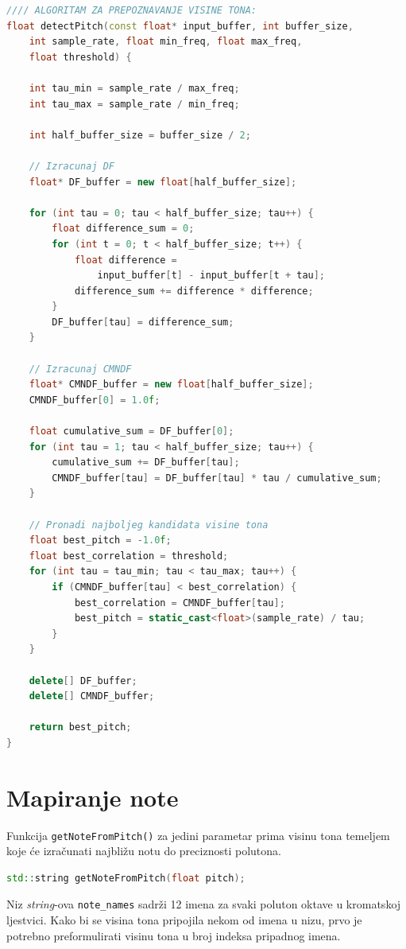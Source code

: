 \documentclass[times, utf8, diplomski, numeric]{fer}
\begin{document}
\begin{lstlisting}[language=C++, frame=single]
//// ALGORITAM ZA PREPOZNAVANJE VISINE TONA:
float detectPitch(const float* input_buffer, int buffer_size,
	int sample_rate, float min_freq, float max_freq,
	float threshold) {
	
	int tau_min = sample_rate / max_freq;
	int tau_max = sample_rate / min_freq;
	
	int half_buffer_size = buffer_size / 2;
	
	// Izracunaj DF
	float* DF_buffer = new float[half_buffer_size];
	
	for (int tau = 0; tau < half_buffer_size; tau++) {
		float difference_sum = 0;
		for (int t = 0; t < half_buffer_size; t++) {
			float difference = 
				input_buffer[t] - input_buffer[t + tau];
			difference_sum += difference * difference;
		}
		DF_buffer[tau] = difference_sum;
	}
	
	// Izracunaj CMNDF
	float* CMNDF_buffer = new float[half_buffer_size];
	CMNDF_buffer[0] = 1.0f;
	
	float cumulative_sum = DF_buffer[0];
	for (int tau = 1; tau < half_buffer_size; tau++) {
		cumulative_sum += DF_buffer[tau];
		CMNDF_buffer[tau] = DF_buffer[tau] * tau / cumulative_sum;
	}
	
	// Pronadi najboljeg kandidata visine tona
	float best_pitch = -1.0f;
	float best_correlation = threshold;
	for (int tau = tau_min; tau < tau_max; tau++) {
		if (CMNDF_buffer[tau] < best_correlation) {
			best_correlation = CMNDF_buffer[tau];
			best_pitch = static_cast<float>(sample_rate) / tau;
		}
	}
	
	delete[] DF_buffer;
	delete[] CMNDF_buffer;
	
	return best_pitch;
}
\end{lstlisting}

\section{Mapiranje note}
%
Funkcija \verb*|getNoteFromPitch()| za jedini parametar prima visinu tona temeljem koje će izračunati najbližu notu do preciznosti polutona.

\begin{lstlisting}[language=C++, frame=single]
std::string getNoteFromPitch(float pitch);
\end{lstlisting}

Niz \textit{string}-ova \verb*|note_names| sadrži 12 imena za svaki poluton oktave u kromatskoj ljestvici. Kako bi se visina tona pripojila nekom od imena u nizu, prvo je potrebno preformulirati visinu tona u broj indeksa pripadnog imena.
\end{document}
